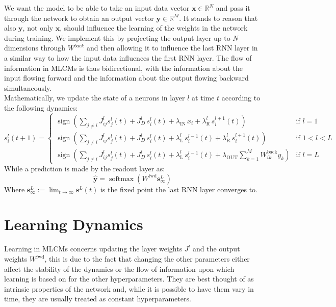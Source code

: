 \documentclass[a4paper,12pt]{report}
\begin{document}
We want the model to be able to take an input data vector $\mathbf{x} \in \mathbb{R}^N$ 
and pass it through the network to obtain an output vector $\mathbf{y} \in 
\mathbb{R}^M$. It stands to reason that also $\mathbf{y}$, not only $\mathbf{x}$, 
should influence the learning of the weights in the network during training. We 
implement this by projecting the output layer up to $N$ dimensions through $W^{back}$ and then allowing 
it to influence the last RNN layer in a similar way to how the input data influences 
the first RNN layer. The flow of information in MLCMs is thus bidirectional, with 
the information about the input flowing forward and the information about the output 
flowing backward simultaneously. \\
Mathematically, we update the state of a neurons in layer $l$ at time $t$ according to the
following dynamics:
\begin{equation}
    s_i^l(t+1) = 
    \begin{cases}
        \operatorname{sign}\left(\displaystyle\sum_{j \neq i} J_{ij}^l s_j^l(t) + 
        J_D^l\, s_i^l(t) + \lambda_{\mathrm{IN}}\, x_i + \lambda_{\mathrm{R}}^l\, s_i^{l+1}(t)
        \right) & \text{if } l = 1 \\[2ex]
        \operatorname{sign}\left(\displaystyle\sum_{j \neq i} J_{ij}^l s_j^l(t) + 
        J_D^l\, s_i^l(t) + \lambda_{\mathrm{L}}^l\, s_i^{l-1}(t) + \lambda_{\mathrm{R}}^l\, s_i^{l+1}(t)
        \right) & \text{if } 1 < l < L \\[2ex]
        \operatorname{sign}\left(\displaystyle\sum_{j \neq i} J_{ij}^l s_j^l(t) + 
        J_D^l\, s_i^l(t) + \lambda_{\mathrm{L}}^l\, s_i^{l-1}(t) + \lambda_{\mathrm{OUT}} 
        \sum_{k=1}^{M} W_{ik}^{\mathrm{back}} y_k\right) & \text{if } l = L
    \end{cases}
    \label{eq:si_update}
\end{equation}
While a prediction is made by the readout layer as:
\begin{equation}
    \hat{\mathbf{y}} = \operatorname{softmax}\left(W^{\mathrm{fwd}} \mathbf{s}^{L}_{\infty}\right)
    \label{eq:yk_update}
\end{equation}
Where $\mathbf{s}^{L}_{\infty} := \lim_{t\to\infty} \mathbf{s}^{L}(t)$ is the fixed 
point the last RNN layer converges to.

\section{Learning Dynamics}
Learning in MLCMs concerns updating the layer weights $J^l$ and the output
weights $W^{\mathrm{fwd}}$, this is due to the fact that changing the other 
parameters either affect the stability of the dynamics or the flow of information 
upon which learning is based on for the other hyperparameters. They are best thought 
of as intrinsic properties of the network and, while it is possible to have them vary 
in time, they are usually treated as constant hyperparameters.
\end{document}
